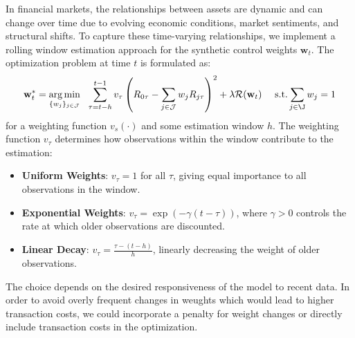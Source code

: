 In financial markets, the relationships between assets are dynamic and can change over time due to evolving economic conditions, market sentiments, and structural shifts. To capture these time-varying relationships, we implement a rolling window estimation approach for the synthetic control weights $\mathbf{w}_t$.
%
%
The optimization problem at time $t$ is formulated as:
\begin{equation}
\mathbf{w}_t^* = 
\underset{\{w_{j}\}_{j\in\mathcal{J}}}{\arg\min} ~~
    \sum_{\tau = t - h}^{t - 1}
    v_{\tau} \left( R_{0\tau} - \sum_{j \in \mathcal{J}} w_{j} R_{j\tau} \right)^2
    + \lambda \mathcal{R}(\mathbf{w}_t)
~~~~
\text{s.t.} \sum_{j\in\J}w_j =1
\end{equation}
for a weighting function $v_s(\cdot)$ and some estimation window $h$. 
The weighting function $v_{\tau}$ determines how observations within the window contribute to the estimation:

\begin{itemize}
    \item \textbf{Uniform Weights}: $v_{\tau} = 1$ for all $\tau$, giving equal importance to all observations in the window.
    \item \textbf{Exponential Weights}: $v_{\tau} = \exp\left( -\gamma (t - \tau) \right)$, where $\gamma > 0$ controls the rate at which older observations are discounted.
    \item \textbf{Linear Decay}: $v_{\tau} = \frac{\tau - (t - h)}{h}$, linearly decreasing the weight of older observations.
\end{itemize}

The choice depends on the desired responsiveness of the model to recent data.
%
In order to avoid overly frequent changes in weughts which would lead to higher transaction costs, we could incorporate a penalty for weight changes or directly include transaction costs in the optimization.

